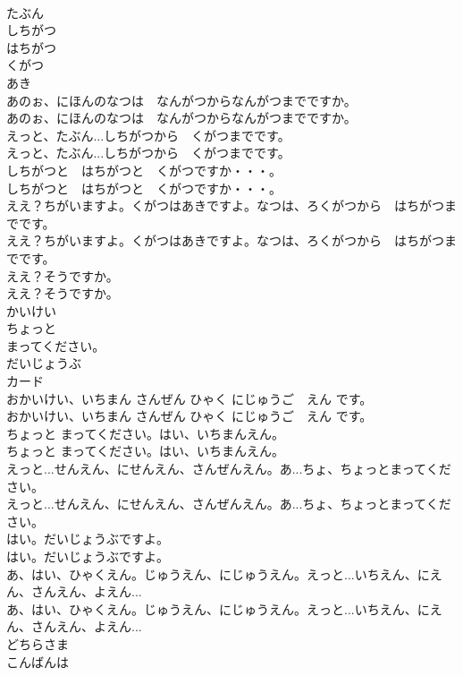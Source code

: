 \documentclass[8pt]{extreport}
\begin{document}
\begin{CJK}{UTF8}{min}
\\	たぶん
\\	しちがつ
\\	はちがつ
\\	くがつ
\\	あき
\\	あのぉ、にほんのなつは　なんがつからなんがつまでですか。	
\\	あのぉ、にほんのなつは　なんがつからなんがつまでですか。 
\\	えっと、たぶん...しちがつから　くがつまでです。	
\\	えっと、たぶん...しちがつから　くがつまでです。 
\\	しちがつと　はちがつと　くがつですか・・・。	
\\	しちがつと　はちがつと　くがつですか・・・。 
\\	ええ？ちがいますよ。くがつはあきですよ。なつは、ろくがつから　はちがつまでです。	
\\	ええ？ちがいますよ。くがつはあきですよ。なつは、ろくがつから　はちがつまでです。 
\\	ええ？そうですか。	
\\	ええ？そうですか。 
\\	かいけい
\\	ちょっと
\\	まってください。
\\	だいじょうぶ
\\	カード
\\	おかいけい、いちまん さんぜん ひゃく にじゅうご　えん です。	
\\	おかいけい、いちまん さんぜん ひゃく にじゅうご　えん です。 
\\	ちょっと まってください。はい、いちまんえん。	
\\	ちょっと まってください。はい、いちまんえん。 
\\	えっと...せんえん、にせんえん、さんぜんえん。あ...ちょ、ちょっとまってください。	
\\	えっと...せんえん、にせんえん、さんぜんえん。あ...ちょ、ちょっとまってください。 
\\	はい。だいじょうぶですよ。	
\\	はい。だいじょうぶですよ。 
\\	あ、はい、ひゃくえん。じゅうえん、にじゅうえん。えっと...いちえん、にえん、さんえん、よえん...	
\\	あ、はい、ひゃくえん。じゅうえん、にじゅうえん。えっと...いちえん、にえん、さんえん、よえん... 
\\	どちらさま
\\	こんばんは

\end{CJK}
\end{document}
